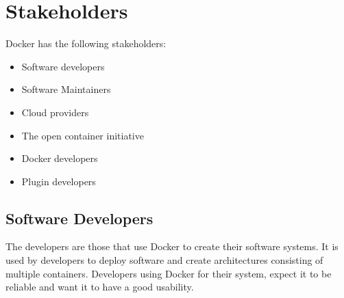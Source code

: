 
\section{Stakeholders}
\label{sec:stakeholders}

Docker has the following stakeholders:
\begin{itemize}
\item Software developers
\item Software Maintainers
\item Cloud providers
\item The open container initiative
\item Docker developers
\item Plugin developers
\end{itemize}

\subsection*{Software Developers}
The developers are those that use Docker to create their software systems. It is used by developers to deploy software and create architectures consisting of multiple containers. Developers using Docker for their system, expect it to be reliable and want it to have a good usability. 

